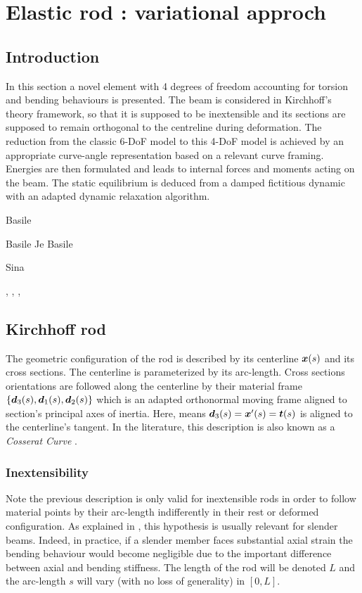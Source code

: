 \chapter{Elastic rod : variational approch}

\section{Introduction}

In this section a novel element with 4 degrees of freedom accounting for torsion and bending behaviours is presented. The beam is considered in Kirchhoff’s theory framework, so that it is supposed to be inextensible and its sections are supposed to remain orthogonal to the centreline during deformation. The reduction from the classic 6-DoF model to this 4-DoF model is achieved by an appropriate curve-angle representation based on a relevant curve framing. Energies are then formulated and leads to internal forces and moments acting on the beam. The static equilibrium is deduced from a damped fictitious dynamic with an adapted dynamic relaxation algorithm.

Basile \cite{Bergou2010}

Basile \cite{Bergou2008}
Je
Basile \cite{Audoly2000}

Sina \cite{Nabei2014}

\cite{Fuller1978}, \cite{deVries2005},  \cite{Vauquelin2000}, \cite{Berger2009}


\section{Kirchhoff rod}
The geometric configuration of the rod is described by its centerline $\boldsymbol{x}(s)$ and its cross sections. The centerline is parameterized by its arc-length. Cross sections orientations are followed along the centerline by their material frame $\{\boldsymbol{d}_3 (s),\boldsymbol{d}_1 (s),\boldsymbol{d}_2 (s)\}$ which is an adapted orthonormal moving frame aligned to section’s principal axes of inertia. Here,  means $\boldsymbol{d}_3 (s)=\boldsymbol{x}'(s)=\boldsymbol{t}(s)$ is aligned to the centerline’s tangent. In the literature, this description is also known as a \emph{Cosserat Curve} \note{[ref]}.

\subsection{Inextensibility}
Note the previous description is only valid for inextensible rods in order to follow material points by their arc-length indifferently in their rest or deformed configuration. As explained in \cite{Audoly2010}, this hypothesis is usually relevant for slender beams. Indeed, in practice, if a slender member faces substantial axial strain the bending behaviour would become negligible due to the important difference between axial and bending stiffness. The length of the rod will be denoted $L$ and the arc-length $s$ will vary (with no loss of generality) in $[0,L]$.

